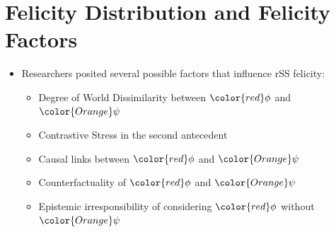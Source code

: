 \section{Felicity Distribution and Felicity Factors}
\begin{frame}[t]
\sectionpage\vskip 18pt
\begin{itemize}
    \item<1->	Researchers posited several possible factors that influence rSS felicity:\vskip 18pt
			\begin{itemize}
                \item<1->	{{Degree of World Dissimilarity between ${\color{red}\phi}$ and ${\color{Orange}\psi}$}} \citep{Lewis2017,Krassnig2017}\vskip 18pt
                \item<2->   Contrastive Stress in the second antecedent \citep{Klecha2014a,krassnig2022ReverseSobel}\vskip 9pt
				\item<3->	{Causal links between ${\color{red}\phi}$ and ${\color{Orange}\psi}$} \citep{Klecha2014a}\vskip 9pt
                \item<4->   Counterfactuality of ${\color{red}\phi}$ and ${\color{Orange}\psi}$ \citep{krassnig2022ReverseSobel}\vskip 9pt
				\item<5->	{Epistemic irresponsibility of considering ${\color{red}\phi}$ without ${\color{Orange}\psi}$} \citep{Moss2012}
			\end{itemize}
\end{itemize}
\end{frame}

